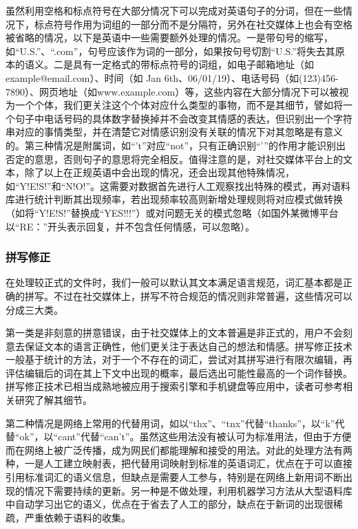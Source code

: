 虽然利用空格和标点符号在大部分情况下可以完成对英语句子的分词，但在一些情况下，标点符号作用为词组的一部分而不是分隔符，另外在社交媒体上也会有空格被省略的情况，以下是英语中一些需要额外处理的情况\cite{jackson2007natural}\cite{mitkov2004oxford}。一是带句号的缩写，如“U.S.”、“.com”，句号应该作为词的一部分，如果按句号切割“U.S.”将失去其原本的语义。二是具有一定格式的带标点符号的词组，如电子邮箱地址（如example@email.com）、时间（如 Jan 6th、06/01/19）、电话号码（如(123)456-7890）、网页地址（如www.example.com）等，这些内容在大部分情况下可以被视为一个个体，我们更关注这个个体对应什么类型的事物，而不是其细节，譬如将一个句子中电话号码的具体数字替换掉并不会改变其情感的表达，但识别出一个字符串对应的事情类型，并在清楚它对情感识别没有关联的情况下对其忽略是有意义的。第三种情况是附属词，如“'t”对应“not”，只有正确识别“'”的作用才能识别出否定的意思，否则句子的意思将完全相反。值得注意的是，对社交媒体平台上的文本，除了以上在正规英语中会出现的情况，还会出现其他特殊情况，如“Y!E!S!”和“N!O!”。这需要对数据首先进行人工观察找出特殊的模式，再对语料库进行统计判断其出现频率，若出现频率较高则新增处理规则将对应模式做转换（如将“Y!E!S!”替换成“YES!!!”）或对问题无关的模式忽略（如国外某微博平台以“RE：”开头表示回复，并不包含任何情感，可以忽略）。

\subsubsection{拼写修正}

在处理较正式的文件时，我们一般可以默认其文本满足语言规范，词汇基本都是正确的拼写。不过在社交媒体上，拼写不符合规范的情况则非常普遍，这些情况可以分成三大类。

第一类是非刻意的拼意错误，由于社交媒体上的文本普遍是非正式的，用户不会刻意去保证文本的语言正确性，他们更关注于表达自己的想法和情感。拼写修正技术一般基于统计的方法，对于一个不存在的词汇，尝试对其拼写进行有限次编辑，再评估编辑后的词在其上下文中出现的概率，最后选出可能性最高的一个词作替换。拼写修正技术已相当成熟地被应用于搜索引擎和手机键盘等应用中，读者可参考相关研究\cite{ahmed2009revised}\cite{nejja2015context}了解其细节。

第二种情况是网络上常用的代替用词，如以“thx”、“tnx”代替“thanks”，以“k”代替“ok”，以“cant”代替“can't”。虽然这些用法没有被认可为标准用法，但由于方便而在网络上被广泛传播，成为网民们都能理解和接受的用法。对此的处理方法有两种，一是人工建立映射表，把代替用词映射到标准的英语词汇，优点在于可以直接引用标准词汇的语义信息，但缺点是需要人工参与，特别是在网络上新用词不断出现的情况下需要持续的更新。另一种是不做处理，利用机器学习方法从大型语料库中自动学习出它的语义，优点在于省去了人工的部分，缺点在于新词的出现很稀疏，严重依赖于语料的收集。

